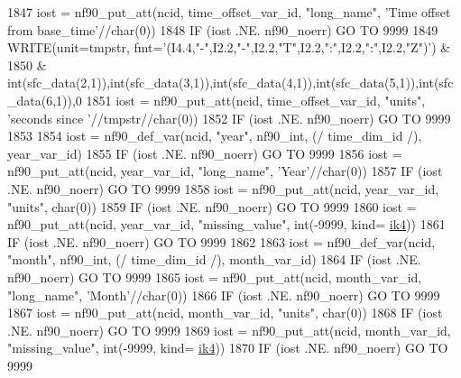 \begin{DoxyCode}
1847     iost    = nf90\_put\_att(ncid, time\_offset\_var\_id, \textcolor{stringliteral}{"long\_name"}, \textcolor{stringliteral}{'Time offset from base\_time'}//char(0))
1848     \textcolor{keywordflow}{IF} (iost .NE. nf90\_noerr) \textcolor{keywordflow}{GO TO} 9999
1849     \textcolor{keyword}{WRITE}(unit=tmpstr, fmt=\textcolor{stringliteral}{'(I4.4,"-",I2.2,"-",I2.2,"T",I2.2,":",I2.2,":",I2.2,"Z")'}) &
1850         & int(sfc\_data(2,1)),int(sfc\_data(3,1)),int(sfc\_data(4,1)),int(sfc\_data(5,1)),int(sfc\_data(6,1)),0
1851     iost    = nf90\_put\_att(ncid, time\_offset\_var\_id, \textcolor{stringliteral}{"units"}, \textcolor{stringliteral}{'seconds since '}//tmpstr//char(0))
1852     \textcolor{keywordflow}{IF} (iost .NE. nf90\_noerr) \textcolor{keywordflow}{GO TO} 9999
1853 
1854     iost    = nf90\_def\_var(ncid, \textcolor{stringliteral}{"year"}, nf90\_int, (/ time\_dim\_id /), year\_var\_id)
1855     \textcolor{keywordflow}{IF} (iost .NE. nf90\_noerr) \textcolor{keywordflow}{GO TO} 9999
1856     iost    = nf90\_put\_att(ncid, year\_var\_id, \textcolor{stringliteral}{"long\_name"}, \textcolor{stringliteral}{'Year'}//char(0))
1857     \textcolor{keywordflow}{IF} (iost .NE. nf90\_noerr) \textcolor{keywordflow}{GO TO} 9999
1858     iost    = nf90\_put\_att(ncid, year\_var\_id, \textcolor{stringliteral}{"units"}, char(0))
1859     \textcolor{keywordflow}{IF} (iost .NE. nf90\_noerr) \textcolor{keywordflow}{GO TO} 9999
1860     iost    = nf90\_put\_att(ncid, year\_var\_id, \textcolor{stringliteral}{"missing\_value"}, int(-9999, kind=
      \hyperlink{namespaceportable_aa110cf333432508140602ea192c4b2ea}{ik4}))
1861     \textcolor{keywordflow}{IF} (iost .NE. nf90\_noerr) \textcolor{keywordflow}{GO TO} 9999
1862 
1863     iost    = nf90\_def\_var(ncid, \textcolor{stringliteral}{"month"}, nf90\_int, (/ time\_dim\_id /), month\_var\_id)
1864     \textcolor{keywordflow}{IF} (iost .NE. nf90\_noerr) \textcolor{keywordflow}{GO TO} 9999
1865     iost    = nf90\_put\_att(ncid, month\_var\_id, \textcolor{stringliteral}{"long\_name"}, \textcolor{stringliteral}{'Month'}//char(0))
1866     \textcolor{keywordflow}{IF} (iost .NE. nf90\_noerr) \textcolor{keywordflow}{GO TO} 9999
1867     iost    = nf90\_put\_att(ncid, month\_var\_id, \textcolor{stringliteral}{"units"}, char(0))
1868     \textcolor{keywordflow}{IF} (iost .NE. nf90\_noerr) \textcolor{keywordflow}{GO TO} 9999
1869     iost    = nf90\_put\_att(ncid, month\_var\_id, \textcolor{stringliteral}{"missing\_value"}, int(-9999, kind=
      \hyperlink{namespaceportable_aa110cf333432508140602ea192c4b2ea}{ik4}))
1870     \textcolor{keywordflow}{IF} (iost .NE. nf90\_noerr) \textcolor{keywordflow}{GO TO} 9999

\end{DoxyCode}
